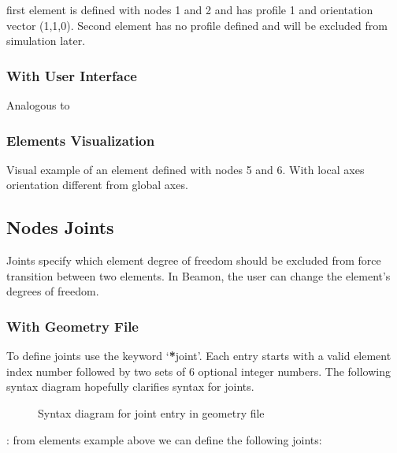 \documentclass[letterpaper,10pt,english]{sphinxmanual}
\begin{document}
first element is defined with nodes 1 and 2 and has profile 1 and orientation vector (1,\sphinxhyphen{}1,0).
Second element has no profile defined and will be excluded from simulation later.


\subsubsection{With User Interface}
\label{\detokenize{making_a_model:id6}}
Analogous to {\hyperref[\detokenize{making_a_model:nodes-input}]{}}


\subsubsection{Elements Visualization}
\label{\detokenize{making_a_model:elements-visualization}}
Visual example of an element defined with nodes 5 and 6. With local axes orientation different from global axes.

\noindent{}


\subsection{Nodes Joints}
\label{\detokenize{making_a_model:nodes-joints}}
Joints specify which element degree of freedom should be excluded from force transition between two elements.
In Beamon, the user can change the element’s degrees of freedom.


\subsubsection{With Geometry File}
\label{\detokenize{making_a_model:id7}}
To define joints use the keyword ‘{\color{red}\bfseries{}*}joint’.
Each entry starts with a valid element index number followed by two sets of 6 optional integer numbers.
The following syntax diagram hopefully clarifies syntax for joints.

\begin{figure}[htbp]
\centering
\capstart

\noindent{}
\caption{Syntax diagram for joint entry in geometry file}\label{\detokenize{making_a_model:id24}}\end{figure}

:
from elements example above we can define the following joints:
\end{document}
